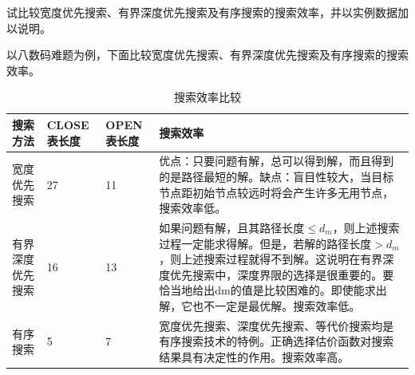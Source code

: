 \begin{question}
试比较宽度优先搜索、有界深度优先搜索及有序搜索的搜索效率，并以实例数据加以说明。
\end{question}
\begin{solution}
以八数码难题为例，下面比较宽度优先搜索、有界深度优先搜索及有序搜索的搜索效率。\par
	\begin{table}[htbp]
	\centering
	\begin{tabular}{p{80pt}p{40pt}p{40pt}p{110pt}}
		\toprule
		搜索方法 & CLOSE表长度 & OPEN表长度 & 搜索效率 \\
		\midrule
		宽度优先搜索 & 27 & 11 &
		优点：只要问题有解，总可以得到解，而且得到的是路径最短的解。缺点：盲目性较大，当目标节点距初始节点较远时将会产生许多无用节点，搜索效率低。 \\
		\midrule
		有界深度优先搜索 & 16 & 13 &
		如果问题有解，且其路径长度$\leq d_m$，则上述搜索过程一定能求得解。但是，若解的路径长度$>d_m$，则上述搜索过程就得不到解。这说明在有界深度优先搜索中，深度界限的选择是很重要的。要恰当地给出dm的值是比较困难的。即使能求出解，它也不一定是最优解。搜索效率低。 \\
		\midrule
		有序搜索 & 5 & 7 &
		宽度优先搜索、深度优先搜索、等代价搜索均是有序搜索技术的特例。正确选择估价函数对搜索结果具有决定性的作用。搜索效率高。\\
		\bottomrule
	\end{tabular}
	\caption{搜索效率比较}\label{tab:comparison-of-searching}
	\end{table} 
\end{solution}


